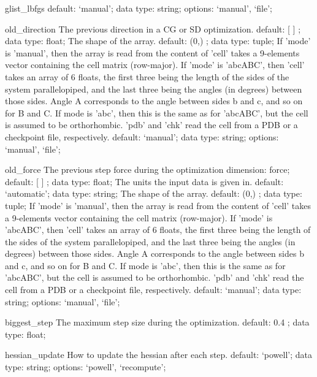 \begin{ipifield}{}
\begin{ipifield}{glist\_lbfgs}
{{default: `manual'; data type: string; options: `manual', `file'; }%
}
\end{ipifield}
\begin{ipifield}{old\_direction}%
{The previous direction in a CG or SD optimization.}%
{default:  [ ] ; data type: float; }%
{%
{The shape of the array.}%
{default:  (0,) ; data type: tuple; }%
%
{If 'mode' is 'manual', then the array is read from the content of 'cell' takes a 9-elements vector containing the cell matrix (row-major). If 'mode' is 'abcABC', then 'cell' takes an array of 6 floats, the first three being the length of the sides of the system parallelopiped, and the last three being the angles (in degrees) between those sides. Angle A corresponds to the angle between sides b and c, and so on for B and C. If mode is 'abc', then this is the same as for 'abcABC', but the cell is assumed to be orthorhombic. 'pdb' and 'chk' read the cell from a PDB or a checkpoint file, respectively.}%
{default: `manual'; data type: string; options: `manual', `file'; }%
}
\end{ipifield}
\begin{ipifield}{old\_force}%
{The previous step force during the optimization}%
{dimension: force; default:  [ ] ; data type: float; }%
{%
{The units the input data is given in.}%
{default: `automatic'; data type: string; }%
%
{The shape of the array.}%
{default:  (0,) ; data type: tuple; }%
%
{If 'mode' is 'manual', then the array is read from the content of 'cell' takes a 9-elements vector containing the cell matrix (row-major). If 'mode' is 'abcABC', then 'cell' takes an array of 6 floats, the first three being the length of the sides of the system parallelopiped, and the last three being the angles (in degrees) between those sides. Angle A corresponds to the angle between sides b and c, and so on for B and C. If mode is 'abc', then this is the same as for 'abcABC', but the cell is assumed to be orthorhombic. 'pdb' and 'chk' read the cell from a PDB or a checkpoint file, respectively.}%
{default: `manual'; data type: string; options: `manual', `file'; }%
}
\end{ipifield}
\begin{ipifield}{biggest\_step}%
{The maximum step size during the optimization.}%
{default:  0.4 ; data type: float; }%
{}
\end{ipifield}
\begin{ipifield}{hessian\_update}%
{How to update the hessian after each step.}%
{default: `powell'; data type: string; options: `powell', `recompute'; }%

\end{ipifield}
\end{ipifield}

